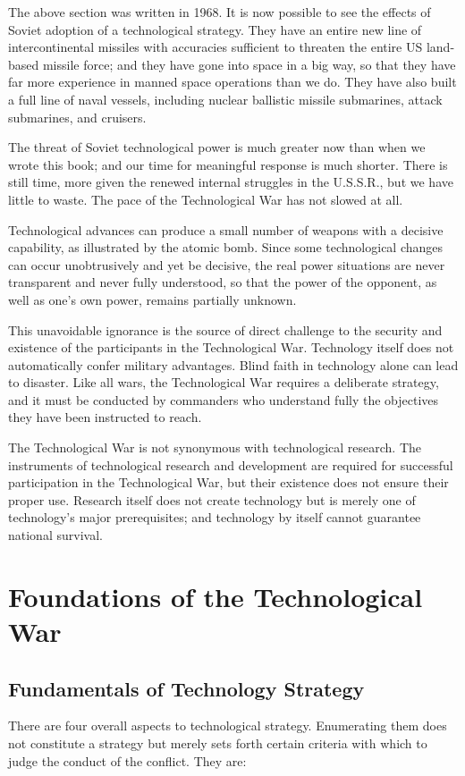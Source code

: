 \begin{mdframed}[backgroundcolor=black!10]
The above section was written in 1968. It is now possible to see the effects of Soviet adoption of a technological strategy. They have an entire new line of intercontinental missiles with accuracies sufficient to threaten the entire US land-based missile force; and they have gone into space in a big way, so that they have far more experience in manned space operations than we do.
They have also built a full line of naval vessels, including nuclear ballistic missile submarines, attack submarines, and cruisers.

The threat of Soviet technological power is much greater now than when we wrote this book; and our time for meaningful response is much shorter. There is still time, more given the renewed internal struggles in the U.S.S.R., but we have little to waste. The pace of the Technological War has not slowed at all.

Technological advances can produce a small number of weapons with a decisive capability, as illustrated by the atomic bomb. Since some technological changes can occur unobtrusively and yet be decisive, the real power situations are never transparent and never fully understood, so that the power of the opponent, as well as one's own power, remains partially unknown.

This unavoidable ignorance is the source of direct challenge to the security and existence of the participants in the Technological War. Technology itself does not automatically confer military advantages. Blind faith in technology alone can lead to disaster. Like all wars, the Technological War requires a deliberate strategy, and it must be conducted by commanders who understand fully the objectives they have been instructed to reach.

The Technological War is not synonymous with technological research. The instruments of technological research and development are required for successful participation in the Technological War, but their existence does not ensure their proper use. Research itself does not create technology but is merely one of technology's major prerequisites; and technology by itself cannot guarantee national survival.
\end{mdframed}

\section{Foundations of the Technological War}
\subsection{Fundamentals of Technology Strategy}
There are four overall aspects to technological strategy. Enumerating them does not constitute a strategy but merely sets forth certain criteria with which to judge the conduct of the conflict. They are:


